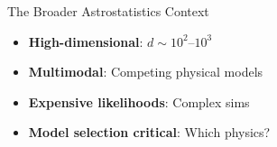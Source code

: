 \documentclass[aspectratio=169]{beamer}
\begin{document}
\begin{frame}
\begin{columns}
        \begin{block}{The Broader Astrostatistics Context}
            \begin{itemize}
                \item \textbf{High-dimensional}: $d \sim 10^2$--$10^3$
                \item \textbf{Multimodal}: Competing physical models
                \item \textbf{Expensive likelihoods}: Complex sims
                \item \textbf{Model selection critical}: Which physics?
            \end{itemize}
        \end{block}
    \end{columns}
\end{frame}
\end{document}
